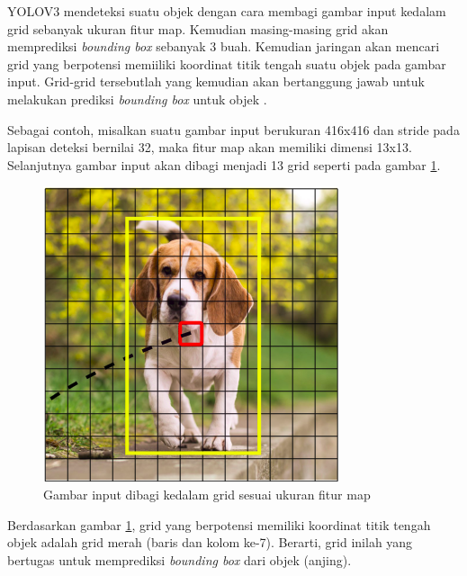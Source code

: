 \documentclass[conference]{IEEEtran}
\begin{document}
YOLOV3 mendeteksi suatu objek dengan cara membagi gambar input kedalam grid sebanyak ukuran fitur map. Kemudian masing-masing grid akan memprediksi \textit{bounding box} sebanyak 3 buah.
Kemudian jaringan akan mencari grid yang berpotensi memiiliki koordinat titik tengah suatu objek pada gambar input. Grid-grid tersebutlah yang kemudian akan bertanggung jawab untuk melakukan prediksi \textit{bounding box} untuk objek \cite{YoloV3}.

Sebagai contoh, misalkan suatu gambar input berukuran 416x416 dan stride pada lapisan deteksi bernilai 32, maka fitur map akan memiliki dimensi 13x13. Selanjutnya gambar input akan dibagi menjadi 13 grid seperti pada gambar \ref{grid_YOLO}.
\begin{figure}
	\centering
	\includegraphics[scale=0.5]{grid_input}
	\caption{Gambar input dibagi kedalam grid sesuai ukuran fitur map}
	\label{grid_YOLO}
\end{figure}
Berdasarkan gambar \ref{grid_YOLO}, grid yang berpotensi memiliki koordinat titik tengah objek adalah grid merah (baris dan kolom ke-7). Berarti, grid inilah yang bertugas untuk memprediksi \textit{bounding box} dari objek (anjing). 
\end{document}
